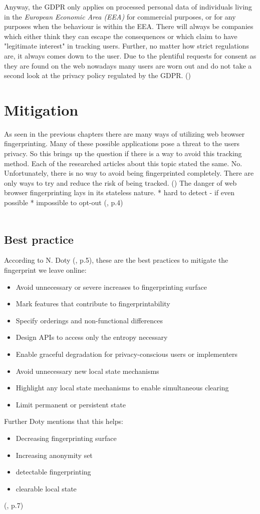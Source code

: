 Anyway, the GDPR only applies on processed personal data of individuals living in the \textit{European Economic Area (EEA)} for commercial purposes, or for any purposes when the behaviour is within the EEA. There will always be companies which either think they can escape the consequences or which claim to have "legitimate interest" in tracking users. Further, no matter how strict regulations are, it always comes down to the user. Due to the plentiful requests for consent as they are found on the web nowadays many users are worn out and do not take a second look at the privacy policy regulated by the GDPR. (\textcite{miele18})

\section{Mitigation}
As seen in the previous chapters there are many ways of utilizing web browser fingerprinting. Many of these possible applications pose a threat to the users privacy. So this brings up the question if there is a way to avoid this tracking method. Each of the researched articles about this topic stated the same. No. Unfortunately, there is no way to avoid being fingerprinted completely. There are only ways to try and reduce the risk of being tracked. (\textcite{web17})
The danger of web browser fingerprinting lays in its stateless nature. 
* hard to detect - if even possible
* impossible to opt-out
(\textcite{upi15}, p.4)
 \\\\
 \subsection{Best practice}
According to N. Doty (\textcite{doty18}, p.5), these are the best practices to mitigate the fingerprint we leave online: 
\begin{itemize}
	\item Avoid unnecessary or severe increases to fingerprinting surface
	\item Mark features that contribute to fingerprintability
	\item Specify orderings and non-functional differences
	\item Design APIs to access only the entropy necessary
	\item Enable graceful degradation for privacy-conscious users or implementers
	\item Avoid unnecessary new local state mechanisms
	\item Highlight any local state mechanisms to enable simultaneous clearing
	\item Limit permanent or persistent state\\
\end{itemize}
Further Doty mentions that this helps: 
\begin{itemize}
	\item Decreasing fingerprinting surface
	\item Increasing anonymity set
	\item detectable fingerprinting
	\item clearable local state
\end{itemize}
(\textcite{doty18}, p.7)\\

